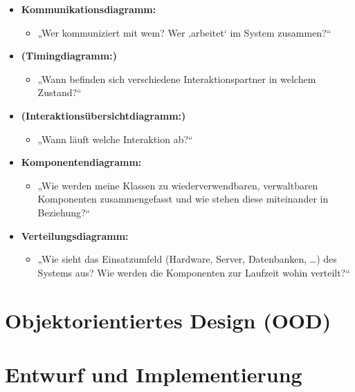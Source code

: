 \documentclass[11pt, a4paper]{article}
\begin{document}
\begin{itemize}
\begin{itemize}
    \end{itemize}
    \item \textbf{Kommunikationsdiagramm:}
    \begin{itemize}
        \item „Wer kommuniziert mit wem? Wer ‚arbeitet‘ im System zusammen?“
    \end{itemize}
    \item \textbf{(Timingdiagramm:)}
    \begin{itemize}
        \item „Wann befinden sich verschiedene Interaktionspartner in welchem Zustand?“
    \end{itemize}
    \item \textbf{(Interaktionsübersichtdiagramm:)}
    \begin{itemize}
        \item „Wann läuft welche Interaktion ab?“
    \end{itemize}
    \item \textbf{Komponentendiagramm:}
    \begin{itemize}
        \item „Wie werden meine Klassen zu wiederverwendbaren, verwaltbaren Komponenten zusammengefasst und wie stehen diese miteinander in Beziehung?“
    \end{itemize}
    \item \textbf{Verteilungsdiagramm:}
    \begin{itemize}
        \item „Wie sieht das Einsatzumfeld (Hardware, Server, Datenbanken, …) des Systems aus? Wie werden die Komponenten zur Laufzeit wohin verteilt?“
    \end{itemize}
\end{itemize}



\section{Objektorientiertes Design (OOD)} %




\section{Entwurf und Implementierung} %
\end{document}
